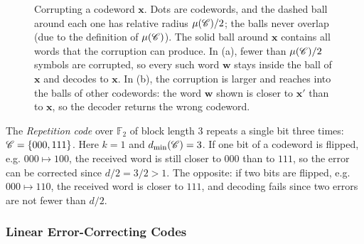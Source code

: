 \documentclass[../../book]{subfiles}
\begin{document}
\begin{figure}[ht]
    \caption{Corrupting a codeword $\mathbf{x}$. Dots are codewords, and the dashed ball around each one has relative radius $\mu(\mathscr{C})/2$; the balls never overlap (due to the definition of $\mu(\mathscr{C})$). The solid ball around $\mathbf{x}$ contains all words that the corruption can produce. In (a), fewer than $\mu(\mathscr{C})/2$ symbols are corrupted, so every such word $\mathbf{w}$ stays inside the ball of $\mathbf{x}$ and decodes to $\mathbf{x}$. In (b), the corruption is larger and reaches into the balls of other codewords: the word $\mathbf{w}$ shown is closer to $\mathbf{x}'$ than to $\mathbf{x}$, so the decoder returns the wrong codeword.}
    \label{fig:unique-decoding}
\end{figure}

\begin{example}\label{ex:repetition}
  The \emph{Repetition code} over $\mathbb{F}_2$ of block length $3$ repeats a single bit three times: $\mathscr{C}=\{000, 111\}$. Here $k=1$ and $d_{\min}(\mathscr{C})=3$. If one bit of a codeword is flipped, e.g. $000 \mapsto 100$, the received word is still closer to $000$ than to $111$, so the error can be corrected since $d/2 = 3/2>1$. The opposite: if two bits are flipped, e.g. $000 \mapsto 110$, the received word is closer to $111$, and decoding fails since two errors are not fewer than $d/2$.
\end{example}

\subsubsection{Linear Error-Correcting Codes}
\end{document}
